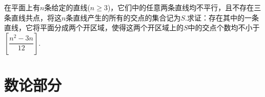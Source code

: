 \documentclass[lang=cn, zihao=4.5]{elegantbook}
\begin{document}
\begin{example} %
	在平面上有$n$条给定的直线($n \geq 3$)，它们中的任意两条直线均不平行，且不存在三条直线共点，将这$n$条直线产生的所有的交点的集合记为$S$.求证：存在其中的一条直线，它将平面分成两个开区域，使得这两个开区域上的$S$中的交点个数均不小于$\left[ \dfrac{n^2-3n}{12} \right]$.
\end{example}
\begin{solution}
	
\end{solution}



\part{数论部分}
\end{document}
